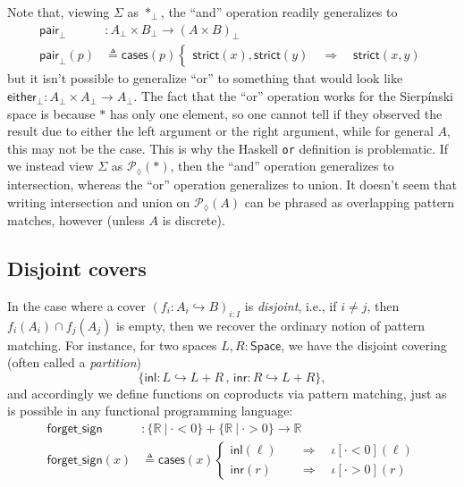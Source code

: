 \documentclass[conference]{IEEEtran}
\newcommand{\Space}{\mathsf{Space}}
\newcommand{\PLower}{\mathcal{P}_\lozenge}
\newcommand{\hookto}{\hookrightarrow}
\newcommand{\R}{\mathbb{R}}
\newcommand{\suchthat}{\ |\ }
\newcommand{\One}{\ast}
\newcommand{\oinclf}[1]{\iota[{#1}]}
\newcommand{\oincl}[2]{\oinclf{#1} \left({#2}\right)}
\newcommand{\Branch}{\Rightarrow}
\begin{document}
Note that, viewing $\Sigma$ as $\One_\bot$, the ``and'' operation readily generalizes to 
\begin{align*}
 \mathsf{pair}_\bot &: A_\bot \times B_\bot \to \left( A \times B \right)_\bot
\\ \mathsf{pair}_\bot(p) &\triangleq \mathsf{cases}(p)
\begin{cases}
\mathsf{strict}(x) , \mathsf{strict}(y)
  \quad \Branch \quad \mathsf{strict}(x, y)
\end{cases}
\end{align*}
but it isn't possible to generalize ``or'' to something that would look like $ \mathsf{either}_\bot: A_\bot \times A_\bot \to A_\bot$. The fact that the ``or'' operation works for the Sierp\'inski space is because $\One$ has only one element, so one cannot tell if they observed the result due to either the left argument or the right argument, while for general $A$, this may not be the case. This is why the Haskell \texttt{or} definition is problematic. If we instead view $\Sigma$ as $\PLower(\One)$, then the ``and'' operation generalizes to intersection, whereas the ``or'' operation generalizes to union. It doesn't seem that writing intersection and union on $\PLower(A)$ can be phrased as overlapping pattern matches, however (unless $A$ is discrete).

\subsection{Disjoint covers}

In the case where a cover $\left( f_i : A_i \hookto B \right)_{i : I}$ is \emph{disjoint}, i.e., if $i \ne j$, then $f_i(A_i) \cap f_j(A_j)$ is empty, then we recover the ordinary notion of pattern matching. For instance, for two spaces $L, R : \Space$, we have the disjoint covering (often called a \emph{partition})
\[
\{ \mathsf{inl} : L \hookto L + R \,,\, \mathsf{inr} : R \hookto L + R \},
\]
and accordingly we define functions on coproducts via pattern matching, just as is possible in any functional programming language:
\begin{align*}
\mathsf{forget\_sign} &: \{ \R \suchthat \cdot < 0 \} + \{ \R \suchthat \cdot > 0 \} \to \R
\\ \mathsf{forget\_sign}(x) &\triangleq
  \mathsf{cases}(x)
  \begin{cases}
  \mathsf{inl}(\ell) \quad &\Branch \quad \oincl{\cdot < 0}{\ell}
  \\ \mathsf{inr}(r) \quad &\Branch \quad \oincl{\cdot > 0}{r}
  \end{cases}
\end{align*}
\end{document}

